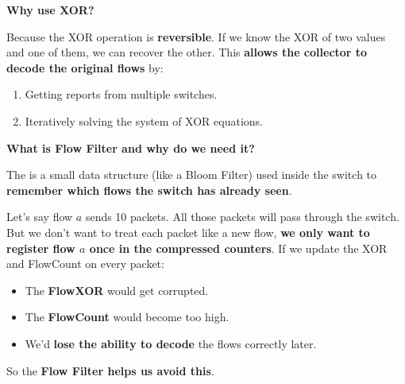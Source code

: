 \highspace
\begin{flushleft}
    \textcolor{Green3}{ \textbf{Why use XOR?}}
\end{flushleft}
Because the XOR operation is \textbf{reversible}. If we know the XOR of two values and one of them, we can recover the other. This \textbf{allows the collector to decode the original flows} by:
\begin{enumerate}
    \item Getting reports from multiple switches.
    \item Iteratively solving the system of XOR equations.
\end{enumerate}

\highspace
\begin{flushleft}
    \textcolor{Red2}{ \textbf{What is Flow Filter and why do we need it?}}
\end{flushleft}
The  is a small data structure (like a Bloom Filter) used inside the switch to \textbf{remember which flows the switch has already seen}.

\highspace
Let's say flow $a$ sends 10 packets. All those packets will pass through the switch. But we don't want to treat each packet like a new flow, \textbf{we only want to register flow $a$ once in the compressed counters}. If we update the XOR and FlowCount on every packet:
\begin{itemize}
    \item The \textbf{FlowXOR} would get corrupted.
    \item The \textbf{FlowCount} would become too high.
    \item We'd \textbf{lose the ability to decode} the flows correctly later.
\end{itemize}
So the \textbf{Flow Filter helps us avoid this}.

